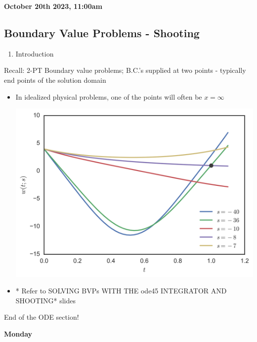 \textbf{October 20th 2023, 11:00am}

\subsection{Boundary Value Problems - Shooting}

\begin{enumerate}
    \item Introduction \newline
\end{enumerate}

Recall: 2-PT Boundary value problems; B.C.'s supplied at two points - typically end points of the solution domain
\begin{itemize}
    \item In idealized physical problems, one of the points will often be $x = \infty$

    \includegraphics[width = 0.8\linewidth]{Images/shooting_ode_bvp.png}
    \item * Refer to SOLVING BVPs WITH THE ode45 INTEGRATOR AND SHOOTING* slides

\end{itemize}

End of the ODE section! \newline

\textbf{Monday}
